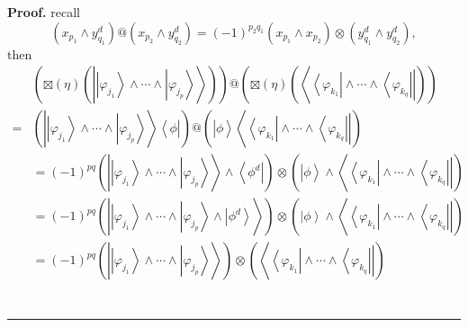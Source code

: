 \documentclass[aps,preprint]{revtex4}%
\newenvironment{proof}[1][Proof]{\noindent\textbf{#1.} }{\ \rule{0.5em}{0.5em}}
\begin{document}
\begin{proof}
recall%
\begin{equation}
\left(  x_{p_{1}}\wedge y_{q_{1}}^{d}\right)  @\left(  x_{p_{2}}\wedge
y_{q_{2}}^{d}\right)  =\left(  -1\right)  ^{p_{2}q_{1}}\left(  x_{p_{1}}\wedge
x_{p_{2}}\right)  \otimes\left(  y_{q_{1}}^{d}\wedge y_{q_{2}}^{d}\right)  ,
\end{equation}
then
\begin{align}
&  \left(  \boxtimes\left(  \eta\right)  \left(  \left\vert
\overset{}{\left\vert \varphi_{j_{1}}\right\rangle \wedge\cdots\wedge
\left\vert \varphi_{j_{p}}\right\rangle }\right\rangle \right)  \right)
@\left(  \boxtimes\left(  \eta\right)  \left(  \left\langle
\overset{}{\left\langle \varphi_{k_{1}}\right\vert \wedge\cdots\wedge
\left\langle \varphi_{k_{q}}\right\vert }\right\vert \right)  \right) \\
=  &  \left(  \left\vert \overset{}{\left\vert \varphi_{j_{1}}\right\rangle
\wedge\cdots\wedge\left\vert \varphi_{j_{p}}\right\rangle }\right\rangle
\left\langle \overset{}{\phi}\right\vert \right)  @\left(  \left\vert
\overset{}{\phi}\right\rangle \left\langle \overset{}{\left\langle
\varphi_{k_{1}}\right\vert \wedge\cdots\wedge\left\langle \varphi_{k_{q}%
}\right\vert }\right\vert \right) \\
&  =\left(  -1\right)  ^{pq}\left(  \left\vert \overset{}{\left\vert
\varphi_{j_{1}}\right\rangle \wedge\cdots\wedge\left\vert \varphi_{j_{p}%
}\right\rangle }\right\rangle \wedge\left\langle \overset{}{\phi^{d}%
}\right\vert \right)  \otimes\left(  \left\vert \overset{}{\phi}\right\rangle
\wedge\left\langle \overset{}{\left\langle \varphi_{k_{1}}\right\vert
\wedge\cdots\wedge\left\langle \varphi_{k_{q}}\right\vert }\right\vert \right)
\\
&  =\left(  -1\right)  ^{pq}\left(  \left\vert \overset{}{\left\vert
\varphi_{j_{1}}\right\rangle \wedge\cdots\wedge\left\vert \varphi_{j_{p}%
}\right\rangle \wedge\left\vert \phi^{d}\right\rangle }\right\rangle \right)
\otimes\left(  \left\vert \phi\right\rangle \wedge\left\langle
\overset{}{\left\langle \varphi_{k_{1}}\right\vert \wedge\cdots\wedge
\left\langle \varphi_{k_{q}}\right\vert }\right\vert \right) \\
&  =\left(  -1\right)  ^{pq}\left(  \left\vert \overset{}{\left\vert
\varphi_{j_{1}}\right\rangle \wedge\cdots\wedge\left\vert \varphi_{j_{p}%
}\right\rangle }\right\rangle \right)  \otimes\left(  \left\langle
\overset{}{\left\langle \varphi_{k_{1}}\right\vert \wedge\cdots\wedge
\left\langle \varphi_{k_{q}}\right\vert }\right\vert \right) \\

\end{align}
\end{proof}
\end{document}

